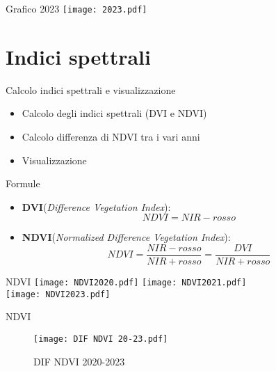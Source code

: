 \documentclass{beamer}
\begin{document}
\begin{frame}{Grafico 2023}
\centering
\texttt{[image: 2023.pdf]}
\end{frame}

\section{Indici spettrali}

\begin{frame}{Calcolo indici spettrali e visualizzazione}
\begin{itemize}
    \item Calcolo degli indici spettrali (DVI e NDVI)
    \item \pause Calcolo differenza di NDVI tra i vari anni
    \item \pause Visualizzazione
\end{itemize}
    
\end{frame}

\begin{frame}{Formule}
    \begin{itemize}
    \item  \textbf{DVI}(\textit{Difference Vegetation Index}):
    \begin{equation}
        NDVI = NIR - rosso
    \end{equation}
    \item \textbf{NDVI}(\textit{Normalized Difference Vegetation Index}):
    \begin{equation}
        NDVI = \frac{NIR - rosso}{NIR + rosso} = \frac{DVI}{NIR + rosso}
    \end{equation}
\end{itemize}
\end{frame}

\begin{frame}{NDVI}
\centering
\texttt{[image: NDVI2020.pdf]}
\texttt{[image: NDVI2021.pdf]}\\
\texttt{[image: NDVI2023.pdf]}
\end{frame}

\begin{frame}{NDVI}
\begin{figure}
    \centering
    \texttt{[image: DIF NDVI 20-23.pdf]}
    \caption{DIF NDVI 2020-2023}
    \end{figure}
\end{frame}
\end{document}
